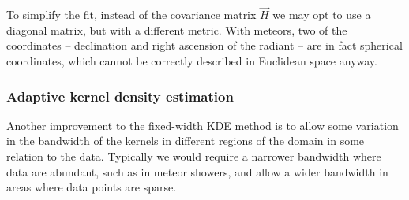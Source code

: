             To simplify the fit, instead of the covariance matrix $\vec{H}$ we may opt to use a diagonal matrix,
            but with a different metric. With meteors, two of the coordinates -- declination
            and right ascension of the radiant -- are in fact spherical coordinates,
            which cannot be correctly described in Euclidean space anyway.

        \subsubsection{Adaptive kernel density estimation} \label{mmka}
            Another improvement to the fixed-width KDE method is to allow some variation in the bandwidth
            of the kernels in different regions of the domain in some relation to the data.
            Typically we would require a narrower bandwidth where data are abundant,
            such as in meteor showers, and allow a wider bandwidth in areas where data points are sparse.
